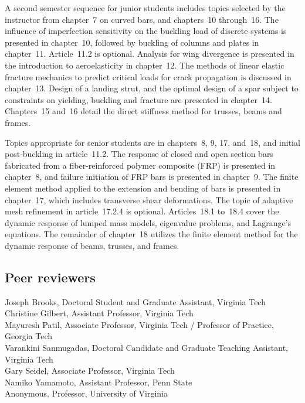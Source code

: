 \documentclass{AeroStructure-ERJohnson}
\begin{document}
\vspace*{12pt}

\noindent A second semester sequence for junior students includes topics selected by
the instructor from chapter~7 on curved bars, and chapters~10 through~16.
The influence of imperfection sensitivity on the buckling load of discrete
systems is presented in chapter~10, followed by buckling of columns and
plates in chapter~11. Article~11.2 is optional. Analysis for wing divergence
is presented in the introduction to aeroelasticity in chapter~12. The
methods of linear elastic fracture mechanics to predict critical loads for
crack propagation is discussed in chapter~13. Design of a landing strut, and
the optimal design of a spar subject to constraints on yielding, buckling
and fracture are presented in chapter~14. Chapters~15 and~16 detail the
direct stiffness method for trusses, beams and frames.

\vspace*{12pt}

\noindent Topics appropriate for senior students are in chapters~8, 9, 17, and~18, and
initial post-buckling in article~11.2. The response of closed and open
section bars fabricated from a fiber-reinforced polymer composite (FRP) is
presented in chapter~8, and failure initiation of FRP bars is presented in
chapter~9. The finite element method applied to the extension and bending of
bars is presented in chapter~17, which includes transverse shear
deformations. The topic of adaptive mesh refinement in article~17.2.4 is
optional. Articles~18.1 to~18.4 cover the dynamic response of lumped mass
models, eigenvalue problems, and Lagrange's equations. The remainder of
chapter~18 utilizes the finite element method for the dynamic response of
beams, trusses, and frames.

\vspace*{20pt}

\subsection*{Peer reviewers}

\vspace*{6pt}

Joseph Brooks, Doctoral Student and Graduate Assistant, Virginia
Tech\\
Christine Gilbert, Assistant Professor, Virginia Tech\\
Mayuresh Patil, Associate Professor, Virginia Tech / Professor of Practice,
Georgia Tech\\
Varankini Sanmugadas, Doctoral Candidate and Graduate Teaching Assistant,
Virginia Tech\\
Gary Seidel, Associate Professor, Virginia Tech\\
Namiko Yamamoto, Assistant Professor, Penn State\\
Anonymous, Professor, University of Virginia
\end{document}
